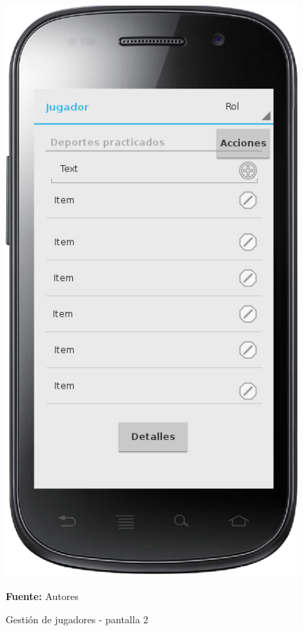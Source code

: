 \begin{figure}[!htb]
  \begin{center}
    \includegraphics[width=11cm]{./imagenes/UI/Jugador/gestion_jugador_2.png}
    \caption{Gestión de jugadores - pantalla 2}
    \label{fig:gestion_jugador_2}
    \textbf{Fuente:}  Autores
  \end{center}
\end{figure}

